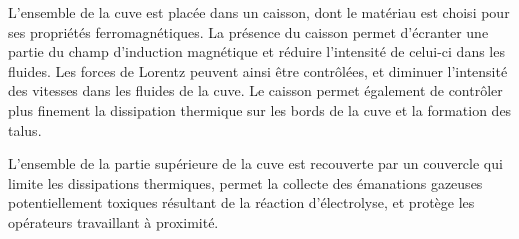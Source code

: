 L'ensemble de la cuve est placée dans un caisson, dont le matériau est
choisi pour ses propriétés ferromagnétiques. La présence du caisson
permet d'écranter une partie du champ d'induction magnétique et
réduire l'intensité de celui-ci dans les fluides. Les forces de
Lorentz peuvent ainsi être contrôlées, et diminuer l'intensité des
vitesses dans les fluides de la cuve. Le caisson permet également de
contrôler plus finement la dissipation thermique sur les bords de la
cuve et la formation des talus.

L'ensemble de la partie supérieure de la cuve est recouverte par un
couvercle qui limite les dissipations thermiques, permet la collecte
des émanations gazeuses potentiellement toxiques résultant de la
réaction d'électrolyse, et protège les opérateurs travaillant à
proximité.
